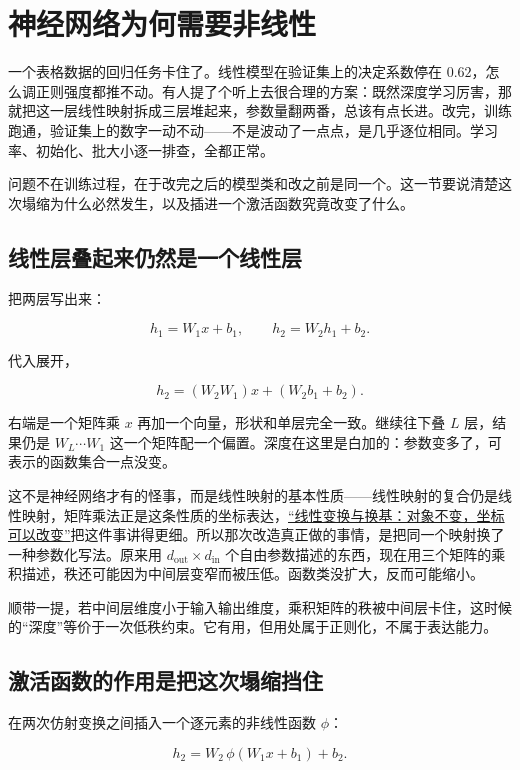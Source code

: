 \section{神经网络为何需要非线性}
\label{sec:14-Deep-Learning/01-Representation-and-Approximation/01}

一个表格数据的回归任务卡住了。线性模型在验证集上的决定系数停在 \(0.62\)，怎么调正则强度都推不动。有人提了个听上去很合理的方案：既然深度学习厉害，那就把这一层线性映射拆成三层堆起来，参数量翻两番，总该有点长进。改完，训练跑通，验证集上的数字一动不动——不是波动了一点点，是几乎逐位相同。学习率、初始化、批大小逐一排查，全都正常。

问题不在训练过程，在于改完之后的模型类和改之前是同一个。这一节要说清楚这次塌缩为什么必然发生，以及插进一个激活函数究竟改变了什么。

\subsection{线性层叠起来仍然是一个线性层}

把两层写出来：

\[
h_1=W_1x+b_1,\qquad
h_2=W_2h_1+b_2.
\]

代入展开，

\[
h_2=(W_2W_1)x+(W_2b_1+b_2).
\]

右端是一个矩阵乘 \(x\) 再加一个向量，形状和单层完全一致。继续往下叠 \(L\) 层，结果仍是 \(W_{L}\cdots W_1\) 这一个矩阵配一个偏置。深度在这里是白加的：参数变多了，可表示的函数集合一点没变。

这不是神经网络才有的怪事，而是线性映射的基本性质——线性映射的复合仍是线性映射，矩阵乘法正是这条性质的坐标表达，\hyperref[sec:03-Linear-Algebra/02-Vector-Spaces/04]{``线性变换与换基：对象不变，坐标可以改变''}把这件事讲得更细。所以那次改造真正做的事情，是把同一个映射换了一种参数化写法。原来用 \(d_{\text{out}}\times d_{\text{in}}\) 个自由参数描述的东西，现在用三个矩阵的乘积描述，秩还可能因为中间层变窄而被压低。函数类没扩大，反而可能缩小。

顺带一提，若中间层维度小于输入输出维度，乘积矩阵的秩被中间层卡住，这时候的``深度''等价于一次低秩约束。它有用，但用处属于正则化，不属于表达能力。

\subsection{激活函数的作用是把这次塌缩挡住}

在两次仿射变换之间插入一个逐元素的非线性函数 \(\phi\)：

\[
h_2=W_2\,\phi(W_1x+b_1)+b_2 .
\]

